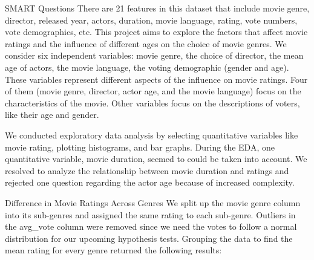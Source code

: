 \documentclass[
  ignorenonframetext,
]{beamer}
\newenvironment{Shaded}{\begin{snugshade}}{\end{snugshade}}
\newcommand{\AttributeTok}[1]{\textcolor[rgb]{0.77,0.63,0.00}{#1}}
\newcommand{\CommentTok}[1]{\textcolor[rgb]{0.56,0.35,0.01}{\textit{#1}}}
\newcommand{\ConstantTok}[1]{\textcolor[rgb]{0.00,0.00,0.00}{#1}}
\newcommand{\FunctionTok}[1]{\textcolor[rgb]{0.00,0.00,0.00}{#1}}
\newcommand{\NormalTok}[1]{#1}
\newcommand{\OtherTok}[1]{\textcolor[rgb]{0.56,0.35,0.01}{#1}}
\newcommand{\SpecialCharTok}[1]{\textcolor[rgb]{0.00,0.00,0.00}{#1}}
\newcommand{\StringTok}[1]{\textcolor[rgb]{0.31,0.60,0.02}{#1}}
\begin{document}
\begin{frame}[fragile]{SMART Questions}
\protect\hypertarget{smart-questions}{}
There are 21 features in this dataset that include movie genre,
director, released year, actors, duration, movie language, rating, vote
numbers, vote demographics, etc. This project aims to explore the
factors that affect movie ratings and the influence of different ages on
the choice of movie genres. We consider six independent variables: movie
genre, the choice of director, the mean age of actors, the movie
language, the voting demographic (gender and age). These variables
represent different aspects of the influence on movie ratings. Four of
them (movie genre, director, actor age, and the movie language) focus on
the characteristics of the movie. Other variables focus on the
descriptions of voters, like their age and gender.

We conducted exploratory data analysis by selecting quantitative
variables like movie rating, plotting histograms, and bar graphs. During
the EDA, one quantitative variable, movie duration, seemed to could be
taken into account. We resolved to analyze the relationship between
movie duration and ratings and rejected one question regarding the actor
age because of increased complexity.

\begin{block}{Difference in Movie Ratings Across Genres}
\protect\hypertarget{difference-in-movie-ratings-across-genres}{}
We split up the movie genre column into its sub-genres and assigned the
same rating to each sub-genre. Outliers in the avg\_vote column were
removed since we need the votes to follow a normal distribution for our
upcoming hypothesis tests. Grouping the data to find the mean rating for
every genre returned the following results:

\begin{Shaded}
\end{Shaded}
\end{block}
\end{frame}
\end{document}
